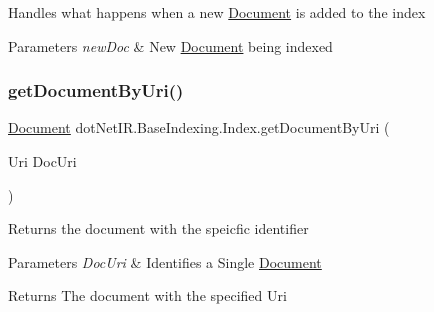Handles what happens when a new \hyperlink{classdot_net_i_r_1_1_base_indexing_1_1_document}{Document} is added to the index 


\begin{DoxyParams}{Parameters}
{\em new\+Doc} & New \hyperlink{classdot_net_i_r_1_1_base_indexing_1_1_document}{Document} being indexed\\
\hline
\end{DoxyParams}
\hypertarget{classdot_net_i_r_1_1_base_indexing_1_1_index_a47412de8014e09501bbd8bb20fae4f25}{}\label{classdot_net_i_r_1_1_base_indexing_1_1_index_a47412de8014e09501bbd8bb20fae4f25} 
\subsubsection{\texorpdfstring{get\+Document\+By\+Uri()}{getDocumentByUri()}}
{\footnotesize\ttfamily \hyperlink{classdot_net_i_r_1_1_base_indexing_1_1_document}{Document} dot\+Net\+I\+R.\+Base\+Indexing.\+Index.\+get\+Document\+By\+Uri (\begin{DoxyParamCaption}\item[{Uri}]{Doc\+Uri }\end{DoxyParamCaption})}



Returns the document with the speicfic identifier 


\begin{DoxyParams}{Parameters}
{\em Doc\+Uri} & Identifies a Single \hyperlink{classdot_net_i_r_1_1_base_indexing_1_1_document}{Document}\\
\hline
\end{DoxyParams}
\begin{DoxyReturn}{Returns}
The document with the specified Uri
\end{DoxyReturn}
\hypertarget{classdot_net_i_r_1_1_base_indexing_1_1_index_a068d3ddbddbd4ea9031a58a61af8bdfb}{}\label{classdot_net_i_r_1_1_base_indexing_1_1_index_a068d3ddbddbd4ea9031a58a61af8bdfb} 
